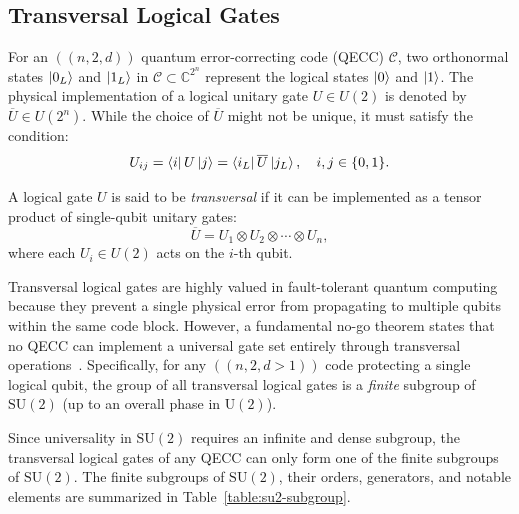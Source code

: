 \documentclass[8pt]{article}
\theoremstyle{definition}
\newcommand{\code}{\mathcal{C}}
\begin{document}
\subsection{Transversal Logical Gates}

For an $((n,2,d))$ quantum error-correcting code (QECC) $\code$, two orthonormal states \(\ket{0_L}\) and \(\ket{1_L}\) in $\code \subset \mathbb{C}^{2^n}$ represent the logical states \(\ket{0}\) and \(\ket{1}\). The physical implementation of a logical unitary gate \(U \in U(2)\) is denoted by \(\overline{U} \in U(2^n)\). While the choice of \(\overline{U}\) might not be unique, it must satisfy the condition:
\[
    U_{ij} = \bra{i}U\ket{j} = \bra{i_L} \overline{U}\ket{j_L}, \quad i,j \in \{0,1\}.
\]

A logical gate \(U\) is said to be \emph{transversal} if it can be implemented as a tensor product of single-qubit unitary gates:
\begin{equation}\label{eq:trans-logical-def}
    \overline{U} = U_1 \otimes U_2 \otimes \cdots \otimes U_n,
\end{equation}
where each \(U_i \in U(2)\) acts on the \(i\)-th qubit.

Transversal logical gates are highly valued in fault-tolerant quantum computing because they prevent a single physical error from propagating to multiple qubits within the same code block. However, a fundamental no-go theorem states that no QECC can implement a universal gate set entirely through transversal operations~\cite{eastin2009restrictions,zeng2011transversality}. Specifically, for any $((n,2,d>1))$ code protecting a single logical qubit, the group of all transversal logical gates is a \emph{finite} subgroup of \(\mathrm{SU}(2)\) (up to an overall phase in \(\mathrm{U}(2)\)).

Since universality in \(\mathrm{SU}(2)\) requires an infinite and dense subgroup, the transversal logical gates of any QECC can only form one of the finite subgroups of \(\mathrm{SU}(2)\). The finite subgroups of \(\mathrm{SU}(2)\), their orders, generators, and notable elements are summarized in Table~\ref{table:su2-subgroup}.
\end{document}
